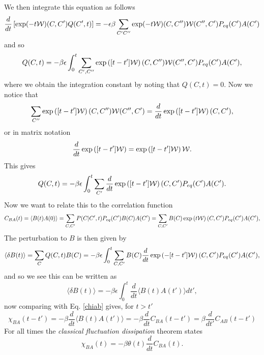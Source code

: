 \documentclass[11pt]{report}
\begin{document}
We then integrate this equation as follows
\begin{equation}
\frac{d}{dt}\left[\exp(-t{\cal W})(C,C') Q(C',t)\right] = - \epsilon\beta\sum_{C' C''}  \exp(-t{\cal W})(C,C''){\cal W}(C'',C') P_{eq}(C')A(C')
\end{equation}
and so
\begin{equation}
Q(C,t) = -\beta \epsilon\int_0^t \sum_{C',C''}\exp\left([t-t']{\cal W}\right)(C,C''){\cal W}(C'',C') P_{eq}(C')A(C'),
\end{equation}
where we obtain the integration constant by noting that $Q(C,t)=0$.
Now we notice that 
\begin{equation}
\sum_{C''}\exp\left([t-t']{\cal W}\right)(C,C''){\cal W}(C'',C')  = \frac{d}{dt}\exp\left([t-t']{\cal W}\right)(C,C'),
\end{equation}
or in matrix notation
\begin{equation}
\frac{d}{dt}\exp\left([t-t']{\cal W}\right)= \exp\left([t-t']{\cal W}\right)\cal{W}.
\end{equation}
This gives
\begin{equation}
Q(C,t) = -\beta \epsilon\int_0^t \sum_{C'}\frac{d}{dt}\exp\left([t-t']{\cal W}\right)(C,C') P_{eq}(C')A(C').
\end{equation}
Now we want to relate this to the correlation function 
\begin{equation}
C_{BA}(t) = \langle B(t) A(0)\rangle = \sum_{C,C'} P(C|C', t)P_{eq}(C') B(C)A(C')
= \sum_{C,C'} B(C) \exp\left(t{\cal W}\right)(C,C')  P_{eq}(C')A(C'),
\end{equation}
The perturbation to $B$ is then given by
\begin{equation}
\langle \delta B(t)\rangle = \sum_{C} Q(C,t)B(C) = -\beta \epsilon\int_0^t \sum_{C,C'} B(C)\frac{d}{dt}\exp\left(-[t-t']{\cal W}\right)(C,C') P_{eq}(C')A(C'),
\end{equation}
and so we see this can be written as
\begin{equation}
\langle \delta B(t)\rangle = -\beta\epsilon\int_0^t\frac{d}{dt} \langle B(t) A(t')\rangle dt',
\end{equation}
 now comparing with Eq. \eqref{chiab} gives, for $t>t'$
 \begin{equation}
 \chi_{BA}(t-t') =-\beta \frac{d}{dt}\langle B(t) A(t')\rangle =  -\beta \frac{d}{dt}C_{BA}(t-t')
 = \beta \frac{d}{dt'}C_{AB}(t-t')
 \end{equation}
For all times the {\em classical fluctuation dissipation} theorem states
\begin{equation}
\boxed{
\chi_{BA}(t)=  -\beta \theta(t)\frac{d}{dt}C_{BA}(t).}
\end{equation}
\end{document}

